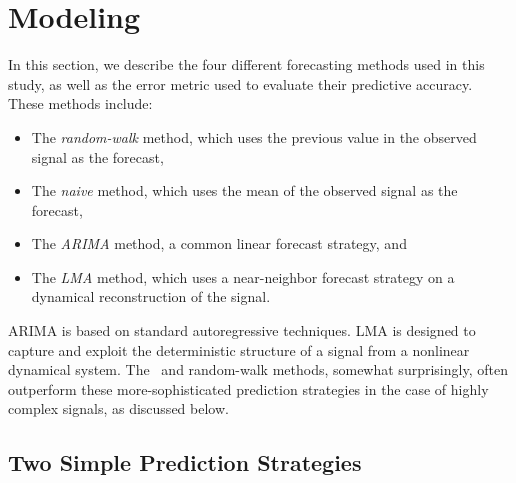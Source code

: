 \section{Modeling }\label{sec:model}
% 
% 
% 
% 

In this section, we describe the four different forecasting methods
used in this study, as well as the error metric used to evaluate their
predictive accuracy.  These methods include:
\begin{itemize}
\item The \emph{random-walk} method, which uses the previous value in
  the observed signal as the forecast,

\item The \emph{naive} method, which uses the mean of the
  observed signal as the forecast,

\item The \emph{ARIMA} method, a common linear forecast strategy, and

\item The \emph{LMA} method, which uses a near-neighbor forecast
  strategy on a dynamical reconstruction of the signal.
\end{itemize}
ARIMA is based on standard autoregressive techniques.  LMA is designed
to capture and exploit the deterministic structure of a signal from a
nonlinear dynamical system.  The \naive ~and random-walk methods,
somewhat surprisingly, often outperform these more-sophisticated
prediction strategies in the case of highly complex signals, as
discussed below.

\subsection{Two Simple Prediction Strategies}
\label{sec:simple}

